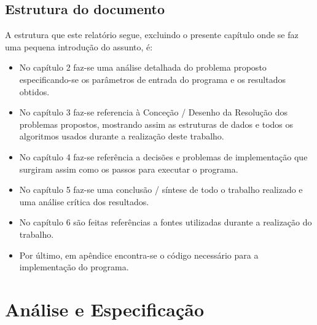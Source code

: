 \documentclass{report}
\begin{document}
\section{Estrutura do documento}
A estrutura que este relat\'orio segue, excluindo o presente cap\'itulo onde se faz uma pequena introdu\c{c}\~{a}o do assunto, \'e: 
\begin{itemize}
\item No cap\'itulo 2 faz-se uma an\'alise detalhada do problema proposto especificando-se os par\^ametros de entrada do programa e os resultados obtidos.
\item No cap\'itulo 3 faz-se referencia \`a Conce\c{c}\~{a}o / Desenho da Resolu\c{c}\~{a}o dos problemas propostos, mostrando assim as estruturas de dados e todos os algoritmos usados durante a realiza\c{c}\~{a}o deste trabalho.
\item No cap\'itulo 4 faz-se refer\^encia a decis\~{o}es e problemas de implementa\c{c}\~{a}o que surgiram assim como os passos para executar o programa. 
\item No cap\'itulo 5 faz-se uma conclus\~{a}o / s\'intese de todo o trabalho realizado e uma an\'alise cr\'itica dos resultados.
\item No cap\'itulo 6 s\~ao feitas refer\^encias a fontes utilizadas durante a realiza\c{c}\~ao do trabalho.
\item Por \'ultimo, em ap\^endice encontra-se o c\'odigo necess\'ario para a implementa\c{c}\~{a}o do programa.
\end{itemize}


\chapter{An\'alise e Especifica\c{c}\~{a}o} 
\end{document}
